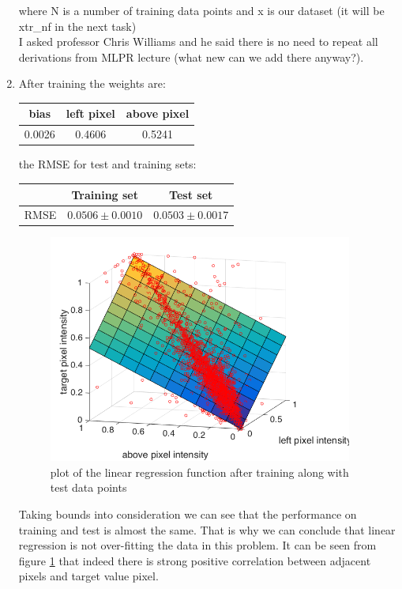 \documentclass{article}
\begin{document}
\begin{enumerate}[label=(\alph*)]
					where N is a number of training data points and x is our dataset (it will be xtr\_nf in the next task)\\
					I asked professor Chris Williams and he said there is no need to repeat all derivations from MLPR lecture (what new can we add there anyway?).
				\item
					After training the weights are:
					\begin{center}
						\begin{tabular}{| c | c | c |}
							\hline
							bias & left pixel & above pixel \\ \hline
							0.0026  & 0.4606 & 0.5241 \\ 
							\hline
						\end{tabular}
					\end{center}					
					the RMSE for test and training sets:
					\begin{center}
						\begin{tabular}{| c | c | c |}
							\hline
							\, & Training set & Test set \\ \hline
							RMSE  & $0.0506 \pm 0.0010$ & $0.0503 \pm 0.0017$ \\ 
							\hline
						\end{tabular}
					\end{center}
				 	\begin{figure}[t]
				 		\centering
				 		\includegraphics[width=10cm]{images/p1-2-c}
				 		\caption{plot of the linear regression function after training along with test data points}
				 		\label{fig:p1-2-c}
				 	\end{figure}
					Taking bounds into consideration we can see that the performance on training and test is almost the same. That is why we can conclude that linear regression is not over-fitting the data in this problem. It can be seen from figure \ref{fig:p1-2-c} that indeed there is strong positive correlation between adjacent pixels and target value pixel. \\

\end{enumerate}
\end{document}
